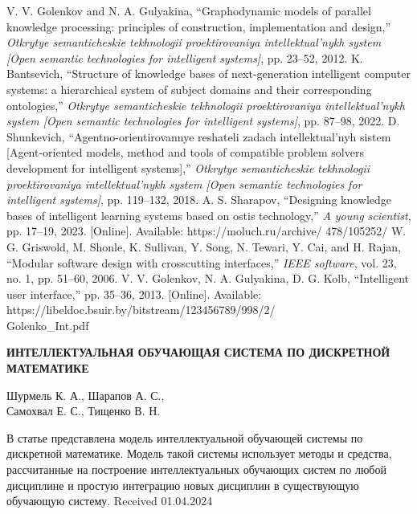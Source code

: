 \documentclass[10pt, a4paper]{article}
\begin{document}
\begin{multicols}{2}
\begin{thebibliography}{196}
\bibitem V. V. Golenkov and N. A. Gulyakina, “Graphodynamic models of parallel knowledge processing: principles of construction, implementation and design,” \textit{Otkrytye semanticheskie tekhnologii proektirovaniya intellektual’nykh system [Open semantic technologies for intelligent systems]}, pp. 23–52, 2012.
\bibitem K. Bantsevich, “Structure of knowledge bases of next-generation intelligent computer systems: a hierarchical system of subject domains and their corresponding ontologies,”\textit{ Otkrytye semanticheskie tekhnologii proektirovaniya intellektual’nykh system [Open semantic technologies for intelligent systems]}, pp. 87–98, 2022.
\bibitem D. Shunkevich, “Agentno-orientirovannye reshateli zadach intellektual’nyh sistem [Agent-oriented models, method and tools of compatible problem solvers development for intelligent systems],” \textit{Otkrytye semanticheskie tekhnologii proektirovaniya intellektual’nykh system [Open semantic technologies for intelligent systems]}, pp. 119–132, 2018.
\bibitem A. S. Sharapov, “Designing knowledge bases of intelligent learning systems based on ostis technology,” \textit{A young scientist},
pp. 17–19, 2023. [Online]. Available: https://moluch.ru/archive/ 478/105252/
\bibitem W. G. Griswold, M. Shonle, K. Sullivan, Y. Song, N. Tewari, Y. Cai, and H. Rajan, “Modular software design with crosscutting interfaces,” \textit{IEEE software}, vol. 23, no. 1, pp. 51–60, 2006.
\bibitem   V. V. Golenkov, N. A. Gulyakina, D. G. Kolb, “Intelligent user interface,” pp. 35–36, 2013. [Online]. Available: https://libeldoc.bsuir.by/bitstream/123456789/998/2/\\Golenko\_Int.pdf
\end{thebibliography}
\begin{center}
    \textbf{ИНТЕЛЛЕКТУАЛЬНАЯ ОБУЧАЮЩАЯ СИСТЕМА ПО ДИСКРЕТНОЙ МАТЕМАТИКЕ}
\end{center}
\begin{center}
    Шурмель К. А., Шарапов А. С.,\\ Самохвал Е. С., Тищенко В. Н.
\end{center}
\par В статье представлена модель интеллектуальной обучающей системы по дискретной математике. Модель такой системы использует методы и средства, рассчитанные на построение интеллектуальных обучающих систем по любой дисциплине и простую интеграцию новых дисциплин в существующую обучающую систему.
\flushright Received 01.04.2024
\end{multicols}
\newpage
\end{document}
